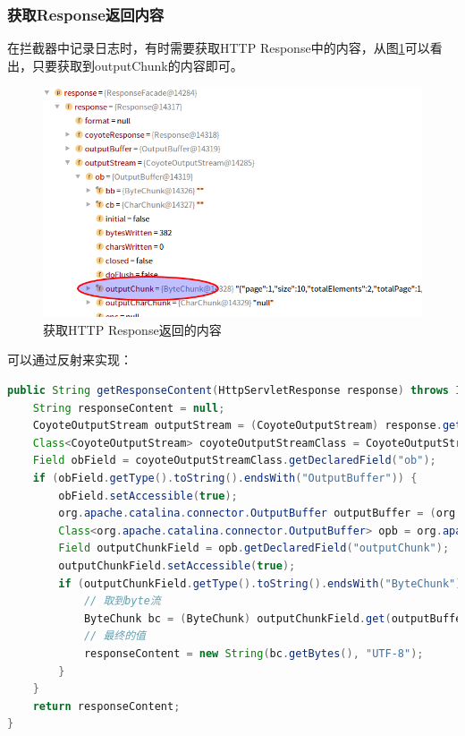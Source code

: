 \documentclass[letter]{book}
\begin{document}
\subsubsection{获取Response返回内容}

在拦截器中记录日志时，有时需要获取HTTP Response中的内容，从图\ref{fig:outputchunkcontent}可以看出，只要获取到outputChunk的内容即可。

\begin{figure}[htbp]
	\centering
	\includegraphics[scale=0.4]{outputchunkcontent.png}
	\caption{获取HTTP Response返回的内容}
	\label{fig:outputchunkcontent}
\end{figure}


可以通过反射来实现：

\begin{lstlisting}[language=Java]
public String getResponseContent(HttpServletResponse response) throws IOException, NoSuchFieldException, IllegalAccessException {
	String responseContent = null;
	CoyoteOutputStream outputStream = (CoyoteOutputStream) response.getOutputStream();
	Class<CoyoteOutputStream> coyoteOutputStreamClass = CoyoteOutputStream.class;
	Field obField = coyoteOutputStreamClass.getDeclaredField("ob");
	if (obField.getType().toString().endsWith("OutputBuffer")) {
		obField.setAccessible(true);
		org.apache.catalina.connector.OutputBuffer outputBuffer = (org.apache.catalina.connector.OutputBuffer) obField.get(outputStream);
		Class<org.apache.catalina.connector.OutputBuffer> opb = org.apache.catalina.connector.OutputBuffer.class;
		Field outputChunkField = opb.getDeclaredField("outputChunk");
		outputChunkField.setAccessible(true);
		if (outputChunkField.getType().toString().endsWith("ByteChunk")) {
			// 取到byte流
			ByteChunk bc = (ByteChunk) outputChunkField.get(outputBuffer);
			// 最终的值
			responseContent = new String(bc.getBytes(), "UTF-8");
		}
	}
	return responseContent;
}
\end{lstlisting}
\end{document}
